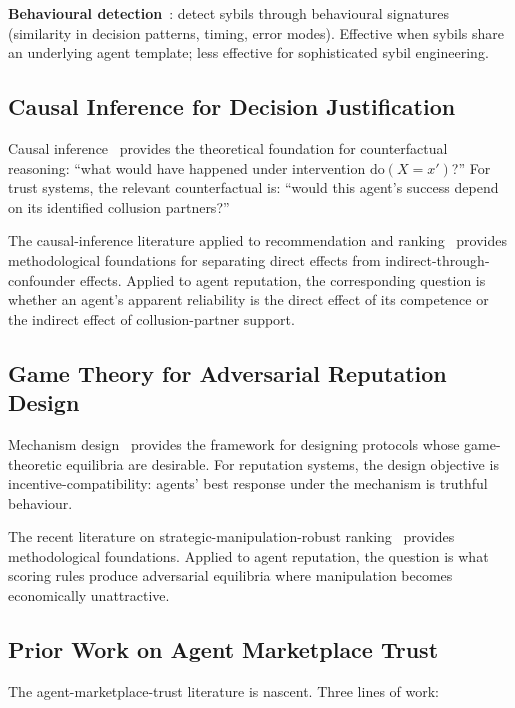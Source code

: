 \documentclass[sigconf,nonacm]{acmart}
\begin{document}
\textbf{Behavioural detection}~\cite{wang2024agentbots}: detect sybils
through behavioural signatures (similarity in decision patterns,
timing, error modes). Effective when sybils share an underlying
agent template; less effective for sophisticated sybil engineering.

\subsection{Causal Inference for Decision Justification}

Causal inference~\cite{pearl2009causality} provides the theoretical
foundation for counterfactual reasoning: ``what would have happened
under intervention $\text{do}(X = x')$?'' For trust systems, the
relevant counterfactual is: ``would this agent's success depend on
its identified collusion partners?''

The causal-inference literature applied to recommendation and
ranking~\cite{wang2024causalrec,janzing2024causal} provides
methodological foundations for separating direct effects from
indirect-through-confounder effects. Applied to agent reputation,
the corresponding question is whether an agent's apparent
reliability is the direct effect of its competence or the
indirect effect of collusion-partner support.

\subsection{Game Theory for Adversarial Reputation Design}

Mechanism design~\cite{nisan2007algorithmic} provides the framework
for designing protocols whose game-theoretic equilibria are
desirable. For reputation systems, the design objective is
incentive-compatibility: agents' best response under the
mechanism is truthful behaviour.

The recent literature on
strategic-manipulation-robust ranking~\cite{liu2024strategicrank,
chen2024gameranking} provides methodological foundations. Applied to
agent reputation, the question is what scoring rules produce
adversarial equilibria where manipulation becomes economically
unattractive.

\subsection{Prior Work on Agent Marketplace Trust}

The agent-marketplace-trust literature is nascent. Three lines of
work:
\end{document}
